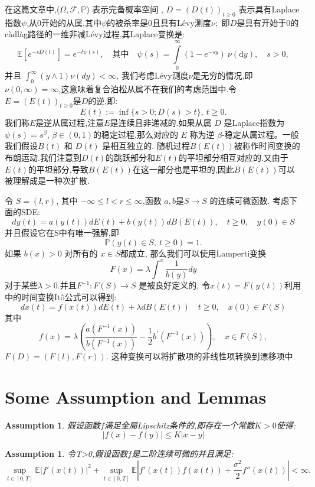 \documentclass[12pt,final]{article}
\numberwithin{equation}{section}
\numberwithin{figure}{section}
\numberwithin{table}{section}
\theoremstyle{plain}
\newtheorem{Assumption}[Theorem]{Assumption} %
\theoremstyle{Definition}
\theoremstyle{Remark}
\begin{document}
	在这篇文章中,($\Omega,\mathcal{F},\mathbb{P}$) 表示完备概率空间 , $D=(D(t))_{t\geq0}$ 表示具有Laplace指数$\psi$,从0开始的从属,其中$\psi$的被杀率是0且具有Lévy测度$\nu;$ 即$D$是具有开始于0的càdlàg路径的一维非减Lévy过程,其Laplace变换是:
	$$\mathbb{E}[e^{-sD(t)}]=e^{-t\psi(s)},\quad\text{其中}\quad\psi(s)=\int\limits_0^\infty(1-e^{-sy})\:\nu(\text{d}y),\quad s>0,$$
	并且 $\int_0^\infty(y\wedge1)\nu(dy) < \infty$,
	我们考虑Lévy测度$\nu$是无穷的情况,即$\nu ( 0, \infty ) = \infty$,这意味着复合泊松从属不在我们的考虑范围中.令 $E=(E(t))_{t\geq0}$是$D$的逆,即:
	$$E(t):=\inf\{s>0;D(s)>t\},\:t\geq0.$$
	我们称$E$是逆从属过程,注意$E$是连续且非递减的.如果从属 $D$ 是Laplace指数为$\psi(s) = s^{\beta}$, $\beta \in (0, 1)$的稳定过程,那么对应的 $E$ 称为逆 $\beta$-稳定从属过程。一般我们假设$B(t)$ 和 $D(t)$ 是相互独立的. 随机过程$B(E(t))$被称作时间变换的布朗运动.我们注意到$D(t)$的跳跃部分和$E(t)$的平坦部分相互对应的.又由于$E(t)$的平坦部分,导致$B(E(t))$在这一部分也是平坦的,因此$B(E(t))$可以被理解成是一种次扩散.
	
	令 $S=(l,r)$, 其中 $-\infty\leq l<r\leq\infty$,函数 $a,b$是$S\to S$ 的连续可微函数. 考虑下面的SDE:
	$$dy(t)=a(y(t))dE(t)+b(y(t))dB(E(t)),\quad t\geq0,\quad y(0)\in S$$
	并且假设它在S中有唯一强解,即
	$$\mathbb{P}(y(t)\in S,\:t\geq0)=1.$$
	如果 $b(x)>0$ 对所有的 $x\in S$都成立, 那么我们可以使用Lamperti变换
	$$F(x)=\lambda\int^x\frac1{b(y)}dy$$
	对于某些$\lambda>0.$并且$F^{-1}:F(S)\to S$ 是被良好定义的, 令$x(t)=F(y(t))$利用\cite{umarov2018beyond}中的时间变换Itô公式可以得到:
	$$dx(t)=f(x(t))dE(t) + \lambda dB(E(t)) \quad t\geq0,\quad x(0)\in F(S)$$
	其中
	$$f(x)=\lambda\left(\frac{a(F^{-1}(x))}{b(F^{-1}(x))}-\frac12b^{\prime}(F^{-1}(x))\right),\quad x\in F(S),$$
	$F(D)=(F(l),F(r)).$ 这种变换可以将扩散项的非线性项转换到漂移项中.
	
	\section{Some  Assumption and Lemmas}
	\begin{Assumption}\label{assum1}
		假设函数$f$满足全局\textnormal{Lipschitz}条件的,即存在一个常数$K>0$使得:
		\begin{equation}
			|f(x)-f(y)| \le K|x-y|
		\end{equation}
	\end{Assumption}
	
	\begin{Assumption}\label{assum2}
		令T>0,假设函数$f$是二阶连续可微的并且满足:
		\begin{equation}
			\sup\limits_{t\in[0,T]}\mathbb{E}\left|f'(x(t))\right|^2+
			\sup\limits_{t\in[0,T]}\mathbb{E}\left|f'(x(t))f(x(t))+
			\frac{\sigma^2}2f''(x(t))\right|<\infty.
		\end{equation}
	\end{Assumption}
	
\end{document}
